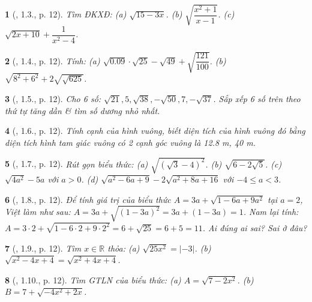 \documentclass{article}
\newtheorem{baitoan}{}%
\begin{document}
\begin{baitoan}[\cite{Binh_boi_duong_Toan_9_tap_1}, 1.3., p. 12]
	Tìm {\rm ĐKXĐ}: (a) $\sqrt{15 - 3x}$. (b) $\sqrt{\dfrac{x^2 + 1}{x - 1}}$. (c) $\sqrt{2x + 10} + \dfrac{1}{x^2 - 4}$.
\end{baitoan}

\begin{baitoan}[\cite{Binh_boi_duong_Toan_9_tap_1}, 1.4., p. 12]
	Tính: (a) $\sqrt{0.09}\cdot\sqrt{25} - \sqrt{49} + \sqrt{\dfrac{121}{100}}$. (b) $\sqrt{8^2 + 6^2} + 2\sqrt{\sqrt{625}}$.
\end{baitoan}

\begin{baitoan}[\cite{Binh_boi_duong_Toan_9_tap_1}, 1.5., p. 12]
	Cho 6 số: $\sqrt{21},5,\sqrt{38},-\sqrt{50},7,-\sqrt{37}$. Sắp xếp 6 số trên theo thứ tự tăng dần \& tìm số dương nhỏ nhất.
\end{baitoan}

\begin{baitoan}[\cite{Binh_boi_duong_Toan_9_tap_1}, 1.6., p. 12]
	Tính cạnh của hình vuông, biết diện tích của hình vuông đó bằng diện tích hình tam giác vuông có 2 cạnh góc vuông là {\rm12.8 m, 40 m}.
\end{baitoan}

\begin{baitoan}[\cite{Binh_boi_duong_Toan_9_tap_1}, 1.7., p. 12]
	Rút gọn biểu thức: (a) $\sqrt{(\sqrt{3} - 4)^2}$. (b) $\sqrt{6 - 2\sqrt{5}}$. (c) $\sqrt{4a^2} - 5a$ với $a > 0$. (d) $\sqrt{a^2 - 6a + 9} - 2\sqrt{a^2 + 8a + 16}$ với $-4\le a < 3$.
\end{baitoan}

\begin{baitoan}[\cite{Binh_boi_duong_Toan_9_tap_1}, 1.8., p. 12]
	Để tính giá trị của biểu thức $A = 3a + \sqrt{1 - 6a + 9a^2}$ tại $a = 2$, Việt làm như sau: $A = 3a + \sqrt{(1 - 3a)^2} = 3a + (1 - 3a) = 1$. Nam lại tính: $A = 3\cdot2 + \sqrt{1 - 6\cdot2 + 9\cdot2^2} = 6 + \sqrt{25} = 6 + 5 = 11$. Ai đúng ai sai? Sai ở đâu?
\end{baitoan}

\begin{baitoan}[\cite{Binh_boi_duong_Toan_9_tap_1}, 1.9., p. 12]
	Tìm $x\in\mathbb{R}$ thỏa: (a) $\sqrt{25x^2} = |-3|$. (b) $\sqrt{x^2 - 4x + 4} = \sqrt{x^2 + 4x + 4}$.
\end{baitoan}

\begin{baitoan}[\cite{Binh_boi_duong_Toan_9_tap_1}, 1.10., p. 12]
	Tìm {\rm GTLN} của biểu thức: (a) $A = \sqrt{7 - 2x^2}$. (b) $B = 7 + \sqrt{-4x^2 + 2x}$.
\end{baitoan}
\end{document}
